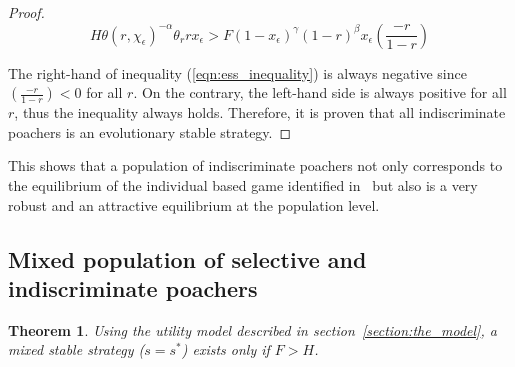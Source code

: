\documentclass[10pt]{article}
\newtheorem{theorem}{Theorem}
\begin{document}
\begin{proof}
    \begin{equation}
    \label{eqn:ess_inequality}
        H\theta(r, \chi_\epsilon) ^{-\alpha} \theta_r r x_\epsilon > F
        (1 - x_\epsilon) ^ {\gamma} (1- r) ^ {\beta}
        x_\epsilon\left(\frac{-r}{1- r}\right)
    \end{equation}

    The right-hand of inequality (\ref{eqn:ess_inequality}) is always negative
    since \((\frac{-r}{1- r}) < 0\)  for all \(r\). On the contrary, the left-hand 
    side is always positive for all \(r\), thus the inequality always holds.
    Therefore, it is proven that all indiscriminate poachers is an evolutionary stable strategy.
\end{proof}

This shows that a population of indiscriminate poachers 
not only corresponds to the equilibrium of the individual based 
game identified in~\cite{Lee} but also is a very robust and an attractive 
equilibrium at the population level.

\subsection{Mixed population of selective and indiscriminate poachers}

\begin{theorem} 
Using the utility model described in section~\ref{section:the_model}, a mixed
stable strategy (\(s=s^*\)) exists only if \(F > H\).  
\end{theorem}
\end{document}
